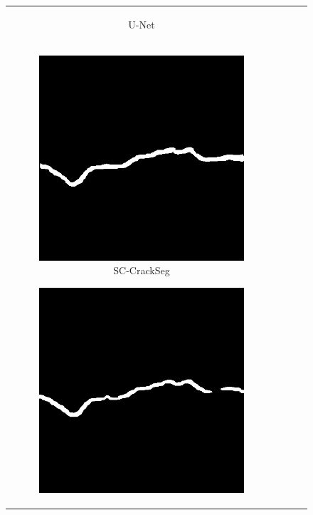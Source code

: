 \documentclass[a4paper,12pt]{report}
\begin{document}
\begin{figure}[htbp]
\begin{tabular}{cccc}
\begin{subfigure}[b]{0.23\textwidth}
            \caption{U-Net}
            \label{fig:crackseg-experiment-qualitative-unet}
        \end{subfigure}
        \\
        \begin{subfigure}[b]{0.23\textwidth}
            \centering
            \includegraphics[width=\textwidth]{res/crackseg-experiment-qualitative/sc-crackseg.png}
            \caption{SC-CrackSeg}
            \label{fig:crackseg-experiment-qualitative-sc-crackseg}
        \end{subfigure}
        \begin{subfigure}[b]{0.23\textwidth}
            \centering
            \includegraphics[width=\textwidth]{res/crackseg-experiment-qualitative/sc-crackseg-2.png}

\end{subfigure}
\end{tabular}
\end{figure}
\end{document}
